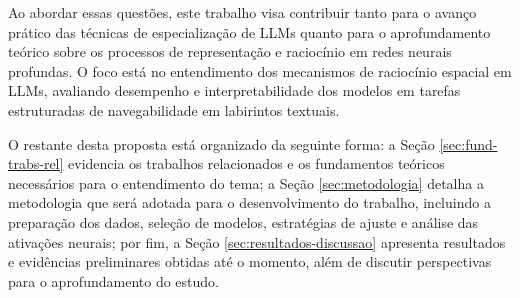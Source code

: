 Ao abordar essas questões, este trabalho visa contribuir tanto para o avanço prático das técnicas de especialização de LLMs quanto para o aprofundamento teórico sobre os processos de representação e raciocínio em redes neurais profundas. O foco está no entendimento dos mecanismos de raciocínio espacial em LLMs, avaliando desempenho e interpretabilidade dos modelos em tarefas estruturadas de navegabilidade em labirintos textuais.

O restante desta proposta está organizado da seguinte forma: a Seção \ref{sec:fund-trabs-rel} evidencia os trabalhos relacionados e os fundamentos teóricos necessários para o entendimento do tema; a Seção \ref{sec:metodologia} detalha a metodologia que será adotada para o desenvolvimento do trabalho, incluindo a preparação dos dados, seleção de modelos, estratégias de ajuste e análise das ativações neurais; por fim, a Seção \ref{sec:resultados-discussao} apresenta resultados e evidências preliminares obtidas até o momento, além de discutir perspectivas para o aprofundamento do estudo.